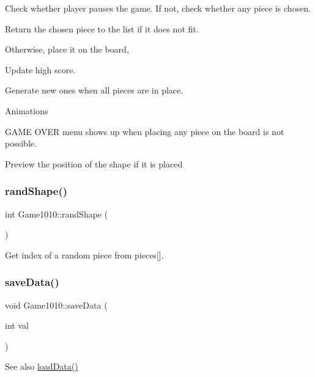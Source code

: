 Check whether player pauses the game. If not, check whether any piece is chosen.

Return the chosen piece to the list if it does not fit.

Otherwise, place it on the board,

Update high score.

Generate new ones when all pieces are in place.

Animations

G\+A\+ME O\+V\+ER menu shows up when placing any piece on the board is not possible.

Preview the position of the shape if it is placed \mbox{\label{class_game1010_a9af7a5b3b193d6edbefc969b1d756c94}} 
\subsubsection{\texorpdfstring{rand\+Shape()}{randShape()}}
{\footnotesize\ttfamily int Game1010\+::rand\+Shape (\begin{DoxyParamCaption}{ }\end{DoxyParamCaption})\hspace{0.3cm}{\ttfamily [inline]}}



Get index of a random piece from pieces\mbox{[}\mbox{]}. 

\mbox{\label{class_game1010_a72900d1043c4d40f953c584a9d9cb6c8}} 
\subsubsection{\texorpdfstring{save\+Data()}{saveData()}}
{\footnotesize\ttfamily void Game1010\+::save\+Data (\begin{DoxyParamCaption}\item[{int}]{val }\end{DoxyParamCaption})\hspace{0.3cm}{\ttfamily [inline]}}

\begin{DoxySeeAlso}{See also}
\mbox{\hyperlink{class_game1010_a3dbbf957de5309f1e7f3d6008f948176}{load\+Data()}} 
\end{DoxySeeAlso}
\mbox{\label{class_game1010_a99d6f53c3073861fe37ef67caa073840}} 
